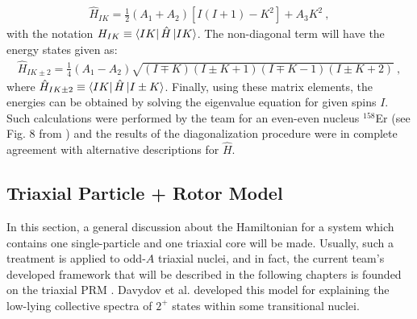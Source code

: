 \begin{align}
    \hat{H}_{IK}=\frac{1}{2}(A_1+A_2)\left[I(I+1)-K^2\right]+A_3K^2\ ,
\end{align}
with the notation $H_{IK}\equiv\bra{IK}\hat{H}\ket{IK}$. The non-diagonal term will have the energy states given as:
\begin{align}
    \hat{H}_{IK\pm2}=\frac{1}{4}(A_1-A_2)\sqrt{(I\mp K)(I\pm K +1)(I \mp K -1)(I\pm K +2)}\ ,
\end{align}
where $\hat{H}_{IK\pm 2}\equiv \bra{IK}\hat{H}\ket{I\pm K}$. Finally, using these matrix elements, the energies can be obtained by solving the eigenvalue equation for given spins $I$. Such calculations were performed by the team for an even-even nucleus $^{158}$Er (see Fig. 8 from  \cite{raduta2017semiclassical}) and the results of the diagonalization procedure were in complete agreement with alternative descriptions for $\hat{H}$.

\subsection{Triaxial Particle + Rotor Model}
\label{tprm-model}

In this section, a general discussion about the Hamiltonian for a system which contains one single-particle and one triaxial core will be made. Usually, such a treatment is applied to odd-$A$ triaxial nuclei, and in fact, the current team's developed framework that will be described in the following chapters is founded on the triaxial PRM \cite{davydov1958rotational}. Davydov et al. developed this model for explaining the low-lying collective spectra of $2^+$ states within some transitional nuclei.

